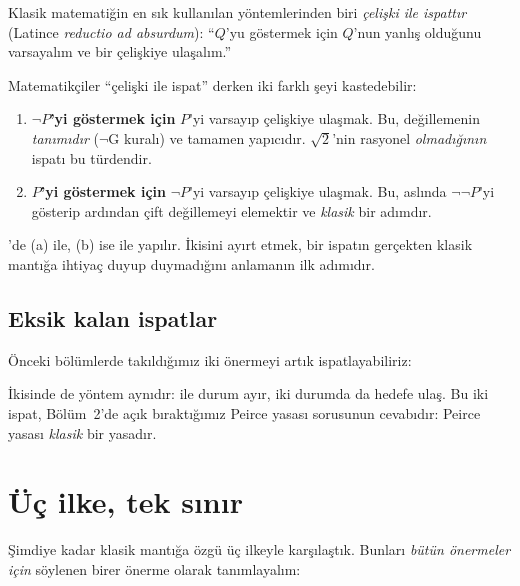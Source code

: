 Klasik matematiğin en sık kullanılan yöntemlerinden biri \emph{çelişki
ile ispattır} (Latince \emph{reductio ad absurdum}): ``$Q$'yu göstermek
için $Q$'nun yanlış olduğunu varsayalım ve bir çelişkiye ulaşalım.''


\begin{dikkat}
Matematikçiler ``çelişki ile ispat'' derken iki farklı şeyi kastedebilir:
\begin{enumerate}[label=(\alph*)]
  \item \textbf{$\neg P$'yi göstermek için} $P$'yi varsayıp çelişkiye
        ulaşmak. Bu, değillemenin \emph{tanımıdır} ($\neg$G kuralı) ve
        tamamen yapıcıdır. $\sqrt{2}$'nin rasyonel \emph{olmadığının}
        ispatı bu türdendir.
  \item \textbf{$P$'yi göstermek için} $\neg P$'yi varsayıp çelişkiye
        ulaşmak. Bu, aslında $\neg\neg P$'yi gösterip ardından çift
        değillemeyi elemektir ve \emph{klasik} bir adımdır.
\end{enumerate}
\Lean{}'de (a)  ile, (b) ise
 ile yapılır. İkisini ayırt etmek, bir
ispatın gerçekten klasik mantığa ihtiyaç duyup duymadığını anlamanın
ilk adımıdır.
\end{dikkat}

\subsection{Eksik kalan ispatlar}

Önceki bölümlerde takıldığımız iki önermeyi artık ispatlayabiliriz:


\noindent İkisinde de yöntem aynıdır:  ile durum ayır,
iki durumda da hedefe ulaş. Bu iki ispat, Bölüm~2'de açık bıraktığımız
Peirce yasası sorusunun cevabıdır: Peirce yasası \emph{klasik} bir
yasadır.

\section{Üç ilke, tek sınır}\label{sec:uc-ilke}

Şimdiye kadar klasik mantığa özgü üç ilkeyle karşılaştık. Bunları
\emph{bütün önermeler için} söylenen birer önerme olarak
tanımlayalım:

